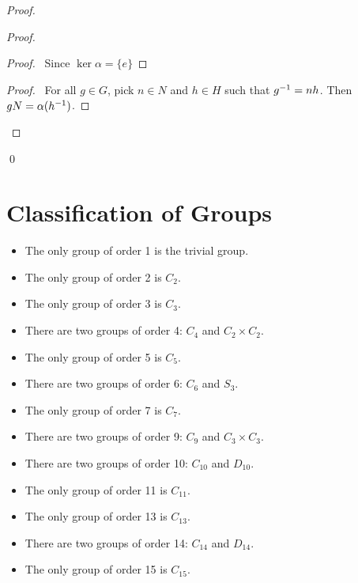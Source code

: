 \begin{proof}
\pf
{}
\begin{proof}
	\begin{proof}
		\pf\ Since $\ker \alpha = \{e\}$
	\end{proof}
	\begin{proof}
		\pf\ For all $g \in G$, pick $n \in N$ and $h \in H$ such that ${g}^{-1} = nh$. Then $gN = \alpha({h}^{-1})$.
	\end{proof}
\end{proof}
\qed
\end{proof}

\chapter{Classification of Groups}

\begin{ex}
\begin{itemize}
\item The only group of order 1 is the trivial group.
\item The only group of order 2 is $C_2$.
\item The only group of order 3 is $C_3$.
\item There are two groups of order 4: $C_4$ and $C_2 \times C_2$.
\item The only group of order 5 is $C_5$.
\item There are two groups of order 6: $C_6$ and $S_3$.
\item The only group of order 7 is $C_7$.
\item There are two groups of order 9: $C_9$ and $C_3 \times C_3$.
\item There are two groups of order 10: $C_{10}$ and $D_{10}$.
\item The only group of order 11 is $C_{11}$.
\item The only group of order 13 is $C_{13}$.
\item There are two groups of order 14: $C_{14}$ and $D_{14}$.
\item The only group of order 15 is $C_{15}$.
\end{itemize}
\end{ex}

